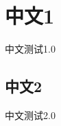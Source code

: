 \documentclass[UTF8]{ctexart}
\begin{document}
\section{中文1} 中文测试1.0

\subsection{中文2}  中文测试2.0
\end{document}
